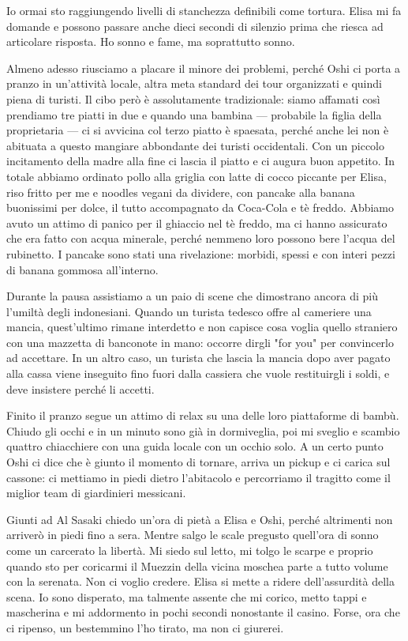 Io ormai sto raggiungendo livelli di stanchezza definibili come tortura. Elisa mi fa domande e possono passare anche dieci secondi di silenzio prima che riesca ad articolare risposta. Ho sonno e fame, ma soprattutto sonno.

Almeno adesso riusciamo a placare il minore dei problemi, perché Oshi ci porta a pranzo in un'attività locale, altra meta standard dei tour organizzati e quindi piena di turisti. Il cibo però è assolutamente tradizionale: siamo affamati così prendiamo tre piatti in due e quando una bambina — probabile la figlia della proprietaria — ci si avvicina col terzo piatto è spaesata, perché anche lei non è abituata a questo mangiare abbondante dei turisti occidentali. Con un piccolo incitamento della madre alla fine ci lascia il piatto e ci augura buon appetito. In totale abbiamo ordinato pollo alla griglia con latte di cocco piccante per Elisa, riso fritto per me e noodles vegani da dividere, con pancake alla banana buonissimi per dolce, il tutto accompagnato da Coca-Cola e tè freddo. Abbiamo avuto un attimo di panico per il ghiaccio nel tè freddo, ma ci hanno assicurato che era fatto con acqua minerale, perché nemmeno loro possono bere l'acqua del rubinetto. I pancake sono stati una rivelazione: morbidi, spessi e con interi pezzi di banana gommosa all'interno.

Durante la pausa assistiamo a un paio di scene che dimostrano ancora di più l'umiltà degli indonesiani. Quando un turista tedesco offre al cameriere una mancia, quest'ultimo rimane interdetto e non capisce cosa voglia quello straniero con una mazzetta di banconote in mano: occorre dirgli "for you" per convincerlo ad accettare. In un altro caso, un turista che lascia la mancia dopo aver pagato alla cassa viene inseguito fino fuori dalla cassiera che vuole restituirgli i soldi, e deve insistere perché li accetti.

Finito il pranzo segue un attimo di relax su una delle loro piattaforme di bambù. Chiudo gli occhi e in un minuto sono già in dormiveglia, poi mi sveglio e scambio quattro chiacchiere con una guida locale con un occhio solo. A un certo punto Oshi ci dice che è giunto il momento di tornare, arriva un pickup e ci carica sul cassone: ci mettiamo in piedi dietro l'abitacolo e percorriamo il tragitto come il miglior team di giardinieri messicani.

Giunti ad Al Sasaki chiedo un'ora di pietà a Elisa e Oshi, perché altrimenti non arriverò in piedi fino a sera. Mentre salgo le scale pregusto quell'ora di sonno come un carcerato la libertà. Mi siedo sul letto, mi tolgo le scarpe e proprio quando sto per coricarmi il Muezzin della vicina moschea parte a tutto volume con la serenata. Non ci voglio credere. Elisa si mette a ridere dell'assurdità della scena. Io sono disperato, ma talmente assente che mi corico, metto tappi e mascherina e mi addormento in pochi secondi nonostante il casino. Forse, ora che ci ripenso, un bestemmino l'ho tirato, ma non ci giurerei.

